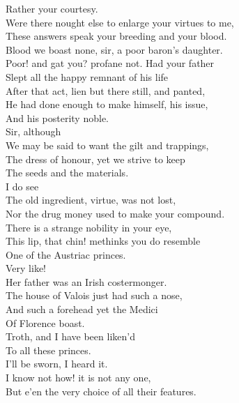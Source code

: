 \documentclass[a4paper,oneside]{memoir}
\begin{document}
\begin{drama*}
\dolspeaks Rather your courtesy.\\
\mammonspeaks {} Were there nought else to enlarge your virtues to me,\\
These answers speak your breeding and your blood.\\
\dolspeaks Blood we boast none, sir, a poor baron's daughter.\\
\mammonspeaks Poor! and gat you? profane not. Had your father\\
Slept all the happy remnant of his life\\
After that act, lien but there still, and panted,\\
He had done enough to make himself, his issue,\\
And his posterity noble.\\
\dolspeaks {} Sir, although\\
We may be said to want the gilt and trappings,\\
The dress of honour, yet we strive to keep\\
The seeds and the materials.\\
\mammonspeaks {} I do see\\
The old ingredient, virtue, was not lost,\\
Nor the drug money used to make your compound.\\
There is a strange nobility in your eye,\\
This lip, that chin! methinks you do resemble\\
One of the Austriac princes.\\
\facespeaks {} Very like!\\
Her father was an Irish costermonger.\\
\mammonspeaks The house of Valois just had such a nose,\\
And such a forehead yet the Medici\\
Of Florence boast.\\
\dolspeaks {} Troth, and I have been liken'd\\
To all these princes.\\
\facespeaks {} I'll be sworn, I heard it.\\
\mammonspeaks {} I know not how! it is not any one,\\
But e'en the very choice of all their features.\\

\end{drama*}
\end{document}
